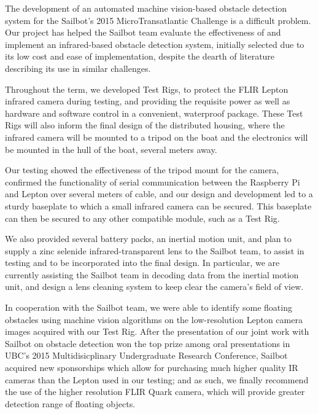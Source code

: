 The development of an automated machine vision-based obstacle detection system for the Sailbot's 2015 MicroTransatlantic Challenge is a difficult problem. Our project has helped the Sailbot team evaluate the effectiveness of and implement an infrared-based obstacle detection system, initially selected due to its low cost and ease of implementation, despite the dearth of literature describing its use in similar challenges. 

Throughout the term, we developed Test Rigs, to protect the FLIR Lepton infrared camera during testing, and providing the requisite power as well as hardware and software control in a convenient, waterproof package. These Test Rigs will also inform the final design of the distributed housing, where the infrared camera will be mounted to a tripod on the boat and the electronics will be mounted in the hull of the boat, several meters away.

Our testing showed the effectiveness of the tripod mount for the camera, confirmed the functionality of serial communication between the Raspberry Pi and Lepton over several meters of cable, and our design and development led to a sturdy baseplate to which a small infrared camera can be secured. This baseplate can then be secured to any other compatible module, such as a Test Rig.

We also provided several battery packs, an inertial motion unit, and plan to supply a zinc selenide infrared-transparent lens to the Sailbot team, to assist in testing and to be incorporated into the final design. In particular, we are currently assisting the Sailbot team in decoding data from the inertial motion unit, and design a lens cleaning system to keep clear the camera's field of view.

In cooperation with the Sailbot team, we were able to identify some floating obstacles using machine vision algorithms on the low-resolution Lepton camera images acquired with our Test Rig. After the presentation of our joint work with Sailbot on obstacle detection won the top prize among oral presentations in UBC's 2015 Multidisicplinary Undergraduate Research Conference, Sailbot acquired new sponsorships which allow for purchasing much higher quality IR cameras than the Lepton used in our testing; and as such, we finally recommend the use of the higher resolution FLIR Quark camera, which will provide greater detection range of floating objects.

